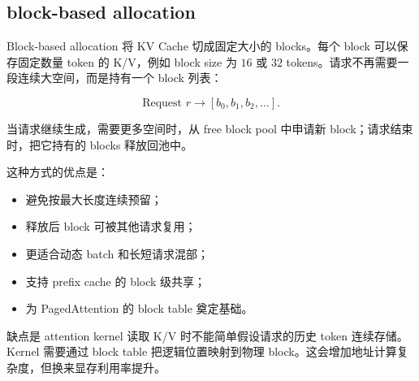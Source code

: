 \subsection{block-based allocation}
\label{subsec:block-based-allocation}

Block-based allocation 将 KV Cache 切成固定大小的 blocks。每个 block 可以保存固定数量 token 的 K/V，例如 block size 为 $16$ 或 $32$ tokens。请求不再需要一段连续大空间，而是持有一个 block 列表：

\[
\text{Request }r
\rightarrow
[b_0,b_1,b_2,\ldots].
\]

当请求继续生成，需要更多空间时，从 free block pool 中申请新 block；请求结束时，把它持有的 blocks 释放回池中。

这种方式的优点是：

\begin{itemize}
\item 避免按最大长度连续预留；
\item 释放后 block 可被其他请求复用；
\item 更适合动态 batch 和长短请求混部；
\item 支持 prefix cache 的 block 级共享；
\item 为 PagedAttention 的 block table 奠定基础。
\end{itemize}

缺点是 attention kernel 读取 K/V 时不能简单假设请求的历史 token 连续存储。Kernel 需要通过 block table 把逻辑位置映射到物理 block。这会增加地址计算复杂度，但换来显存利用率提升。

